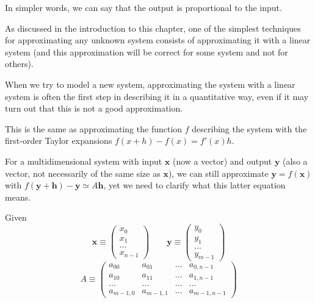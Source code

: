 \documentclass[justified,sixbynine]{tufte-book}
\theoremstyle{plain}%
\theoremstyle{definition}
\theoremstyle{remark}
\begin{document}
\begin{fullwidth}
In simpler words, we can say that the output is proportional to the input.

As discussed in the introduction to this chapter, one of the simplest techniques for approximating any unknown system consists of approximating it with a linear system (and this approximation will be correct for some system and not for others).

When we try to model a new system, approximating the system with a linear system is often the first step in describing it in a quantitative way, even if it may turn out that this is not a good approximation.

This is the same as approximating the function $f$ describing the system with the first-order Taylor expansions $f(x+h) - f(x) = f'(x) h$.

For a multidimensional system with input $\mathbf{x}$ (now a vector) and output $\mathbf{y}$ (also a vector, not necessarily of the same size as $\mathbf{x}$), we can still approximate $\mathbf{y}=f(\mathbf{x})$ with
$f(\mathbf{y}+\mathbf{h}) - \mathbf{y} \simeq A \mathbf{h}$, yet we need to clarify what this latter equation means.

Given
\begin{equation}
\mathbf{x} \equiv \begin{pmatrix}x_0\\x_1\\\dots\\x_{n-1}\end{pmatrix}\qquad
\mathbf{y} \equiv \begin{pmatrix}y_0\\y_1\\\dots\\y_{m-1}\end{pmatrix}
\end{equation}
\begin{equation}
A \equiv \begin{pmatrix}
a_{00} & a_{01} & \dots & a_{0,n-1} \\
a_{10} & a_{11} & \dots & a_{1,n-1} \\
\dots & \dots & \dots & \dots \\
a_{m-1,0} & a_{m-1,1} & \dots & a_{m-1,n-1}
\end{pmatrix}
\end{equation}


\end{fullwidth}
\end{document}
